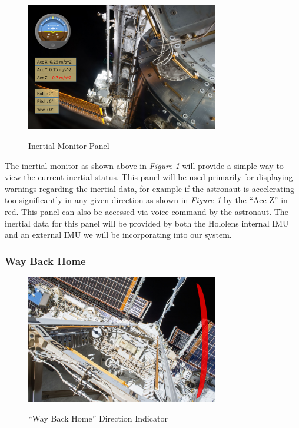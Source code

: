 \documentclass{article}
\let\Oldsubsubsection\subsubsection
\renewcommand{\subsubsection}{\FloatBarrier\Oldsubsubsection}
\begin{document}
\begin{figure}[!htb]
  \centering
  \caption{Inertial Monitor Panel}
  \includegraphics[width=0.75\textwidth]{assets/suitmetrics.png}
  \label{fig:suitmetrics}
\end{figure}

The inertial monitor as shown above in \textit{Figure \ref{fig:suitmetrics}} will provide a simple way to view the current inertial status. This panel will be used primarily for displaying warnings regarding the inertial data, for example if the astronaut is accelerating too significantly in any given direction as shown in \textit{Figure \ref{fig:suitmetrics}} by the “Acc Z” in red.  This panel can also be accessed via voice command by the astronaut. The inertial data for this panel will be provided by both the Hololens internal IMU and an external IMU we will be incorporating into our system.

\subsubsection{Way Back Home}

\begin{figure}[!htb]
  \centering
  \caption{“Way Back Home” Direction Indicator}
  \includegraphics[width=0.75\textwidth]{assets/wayhome.png}
  \label{fig:wayhome}
\end{figure}
\end{document}
